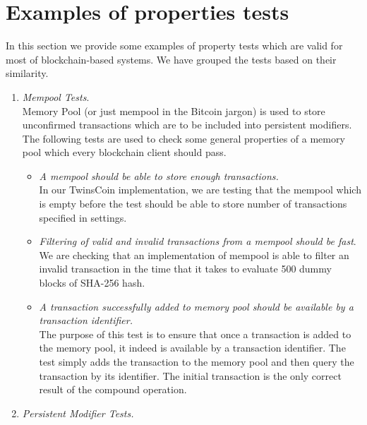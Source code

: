 
\section{Examples of properties tests}
\label{sec:examples}

In this section we provide some examples of property tests which are valid for most of blockchain-based systems. We have grouped the tests based on their similarity.

\begin{enumerate}[\IEEEsetlabelwidth{Z}]
\item \textit{Mempool Tests}.\\
Memory Pool (or just mempool in the Bitcoin jargon) is used to store unconfirmed transactions which are to be included into persistent modifiers. The following tests are used to check some general properties of a memory pool which every blockchain client should pass.

\begin{itemize}[]

\item \textit{A mempool should be able to store enough transactions.}\\
In our TwinsCoin implementation, we are testing that the mempool which is empty before the test should be able to store number of transactions specified in settings.

\item \textit{Filtering of valid and invalid transactions from a mempool should be fast}.\\
We are checking that an implementation of mempool is able to filter an invalid transaction in the time that it takes to evaluate 500 dummy blocks of SHA-256 hash.

\item \textit{A transaction successfully added to memory pool should be available by a transaction identifier.}\\

The purpose of this test is to ensure that once a transaction is added to the memory pool, it indeed is available by a transaction identifier. The test simply adds the transaction to the memory pool and then query the transaction by its identifier. The initial transaction is the only correct result of the compound operation. 

\end{itemize}

\item \textit{Persistent Modifier Tests.}\\


\end{enumerate}
